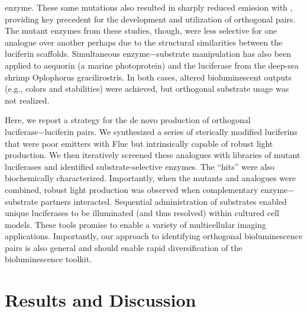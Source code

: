 enzyme.\cite{Harwood:2011gl} These same mutations also resulted in sharply
reduced emission with \dluciferin{}, providing key precedent for
the development and utilization of orthogonal pairs.\cite{AdamsJr:2016bn} The
mutant enzymes from these studies, though, were less selective
for one analogue over another perhaps due to the structural
similarities between the luciferin scaffolds. Simultaneous enzyme−substrate manipulation has also been applied to
aequorin (a marine photoprotein) and the luciferase from the
deep-sea shrimp Oplophorus gracilirostris.\cite{Rowe:2009bd,Hall:2012cda} In both cases,
altered bioluminescent outputs (e.g., colors and stabilities) were
achieved, but orthogonal substrate usage was not realized.
\par
Here, we report a strategy for the de novo production of
orthogonal luciferase−luciferin pairs. We synthesized a series of
sterically modified luciferins that were poor emitters with Fluc
but intrinsically capable of robust light production. We then
iteratively screened these analogues with libraries of mutant
luciferases and identified substrate-selective enzymes. The
“hits” were also biochemically characterized. Importantly,
when the mutants and analogues were combined, robust light
production was observed when complementary enzyme−
substrate partners interacted. Sequential administration of
substrates enabled unique luciferases to be illuminated (and
thus resolved) within cultured cell models. These tools promise
to enable a variety of multicellular imaging applications.
Importantly, our approach to identifying orthogonal bioluminescence
pairs is also general and should enable rapid
diversification of the bioluminescence toolkit.

\section{Results and Discussion}

